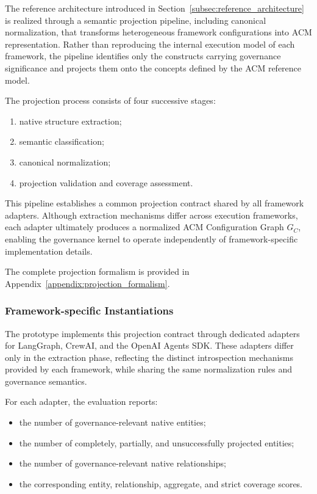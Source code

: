 \documentclass[10pt]{article}
\begin{document}
The reference architecture introduced in Section~\ref{subsec:reference_architecture} is realized through a semantic projection pipeline, including canonical normalization, that transforms heterogeneous framework configurations into ACM representation. Rather than reproducing the internal execution model of each framework, the pipeline identifies only the constructs carrying governance significance and projects them onto the concepts defined by the ACM reference model.

The projection process consists of four successive stages:

\begin{enumerate}
	\item native structure extraction;
	\item semantic classification;
	\item canonical normalization;
	\item projection validation and coverage assessment.
\end{enumerate}

This pipeline establishes a common projection contract shared by all framework
adapters. Although extraction mechanisms differ across execution frameworks,
each adapter ultimately produces a normalized ACM Configuration Graph $G_C$,
enabling the governance kernel to operate independently of framework-specific
implementation details.

The complete projection formalism is provided in Appendix~\ref{appendix:projection_formalism}.

\subsubsection{Framework-specific Instantiations}

The prototype implements this projection contract through dedicated adapters for LangGraph, CrewAI, and the OpenAI Agents SDK. These adapters differ only in the extraction phase, reflecting the distinct introspection mechanisms provided by each framework, while sharing the same normalization rules and governance semantics.

For each adapter, the evaluation reports:

\begin{itemize}
	\item the number of governance-relevant native entities;
	\item the number of completely, partially, and unsuccessfully projected entities;
	\item the number of governance-relevant native relationships;
	\item the corresponding entity, relationship, aggregate, and strict coverage scores.
\end{itemize}
\end{document}
